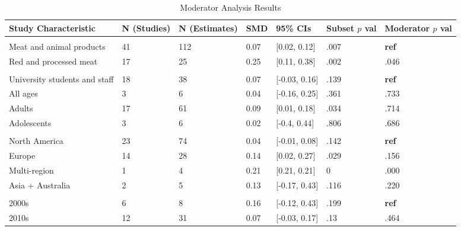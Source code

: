 \documentclass[sn-nature,referee,pdflatex]{sn-jnl}
\begin{document}
\begin{table}[!ht]
\centering
\caption{\label{tab:table_two}Moderator Analysis Results}
\centering
\begin{tabular}[t]{lllllll}
\toprule
Study Characteristic & N (Studies) & N (Estimates) & SMD & 95\% CIs & Subset $p$ val & Moderator $p$ val\\
\midrule
\addlinespace[0.3em]
\multicolumn{7}{l}{\textbf{Outcome}}\\
\hspace{1em}Meat and animal products & 41 & 112 & 0.07 & {}[0.02, 0.12] & .007 & \textbf{ref}\\
\hspace{1em}Red and processed meat & 17 & 25 & 0.25 & {}[0.11, 0.38] & .002 & .046\\
\addlinespace[0.3em]
\multicolumn{7}{l}{\textbf{Population}}\\
\hspace{1em}University students and staff & 18 & 38 & 0.07 & {}[-0.03, 0.16] & .139 & \textbf{ref}\\
\hspace{1em}All ages & 3 & 6 & 0.04 & {}[-0.16, 0.25] & .361 & .733\\
\hspace{1em}Adults & 17 & 61 & 0.09 & {}[0.01, 0.18] & .034 & .714\\
\hspace{1em}Adolescents & 3 & 6 & 0.02 & {}[-0.4, 0.44] & .806 & .686\\
\addlinespace[0.3em]
\multicolumn{7}{l}{\textbf{Region}}\\
\hspace{1em}North America & 23 & 74 & 0.04 & {}[-0.01, 0.08] & .142 & \textbf{ref}\\
\hspace{1em}Europe & 14 & 28 & 0.14 & {}[0.02, 0.27] & .029 & .156\\
\hspace{1em}Multi-region & 1 & 4 & 0.21 & {}[0.21, 0.21] & 0 & .000\\
\hspace{1em}Asia + Australia & 2 & 5 & 0.13 & {}[-0.17, 0.43] & .116 & .220\\
\addlinespace[0.3em]
\multicolumn{7}{l}{\textbf{Publication Decade}}\\
\hspace{1em}2000s & 6 & 8 & 0.16 & {}[-0.12, 0.43] & .199 & \textbf{ref}\\
\hspace{1em}2010s & 12 & 31 & 0.07 & {}[-0.03, 0.17] & .13 & .464\\

\end{tabular}
\end{table}
\end{document}
